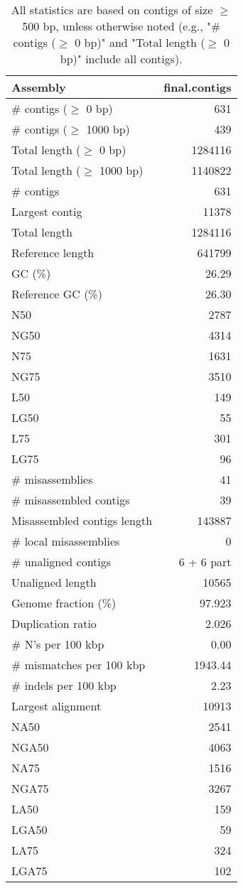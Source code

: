 \documentclass[12pt,a4paper]{article}
\begin{document}
\begin{table}[ht]
\begin{center}
\caption{All statistics are based on contigs of size $\geq$ 500 bp, unless otherwise noted (e.g., "\# contigs ($\geq$ 0 bp)" and "Total length ($\geq$ 0 bp)" include all contigs).}
\begin{tabular}{|l*{1}{|r}|}
\hline
Assembly & final.contigs \\ \hline
\# contigs ($\geq$ 0 bp) & 631 \\ \hline
\# contigs ($\geq$ 1000 bp) & 439 \\ \hline
Total length ($\geq$ 0 bp) & 1284116 \\ \hline
Total length ($\geq$ 1000 bp) & 1140822 \\ \hline
\# contigs & 631 \\ \hline
Largest contig & 11378 \\ \hline
Total length & 1284116 \\ \hline
Reference length & 641799 \\ \hline
GC (\%) & 26.29 \\ \hline
Reference GC (\%) & 26.30 \\ \hline
N50 & 2787 \\ \hline
NG50 & 4314 \\ \hline
N75 & 1631 \\ \hline
NG75 & 3510 \\ \hline
L50 & 149 \\ \hline
LG50 & 55 \\ \hline
L75 & 301 \\ \hline
LG75 & 96 \\ \hline
\# misassemblies & 41 \\ \hline
\# misassembled contigs & 39 \\ \hline
Misassembled contigs length & 143887 \\ \hline
\# local misassemblies & 0 \\ \hline
\# unaligned contigs & 6 + 6 part \\ \hline
Unaligned length & 10565 \\ \hline
Genome fraction (\%) & 97.923 \\ \hline
Duplication ratio & 2.026 \\ \hline
\# N's per 100 kbp & 0.00 \\ \hline
\# mismatches per 100 kbp & 1943.44 \\ \hline
\# indels per 100 kbp & 2.23 \\ \hline
Largest alignment & 10913 \\ \hline
NA50 & 2541 \\ \hline
NGA50 & 4063 \\ \hline
NA75 & 1516 \\ \hline
NGA75 & 3267 \\ \hline
LA50 & 159 \\ \hline
LGA50 & 59 \\ \hline
LA75 & 324 \\ \hline
LGA75 & 102 \\ \hline
\end{tabular}
\end{center}
\end{table}
\end{document}
